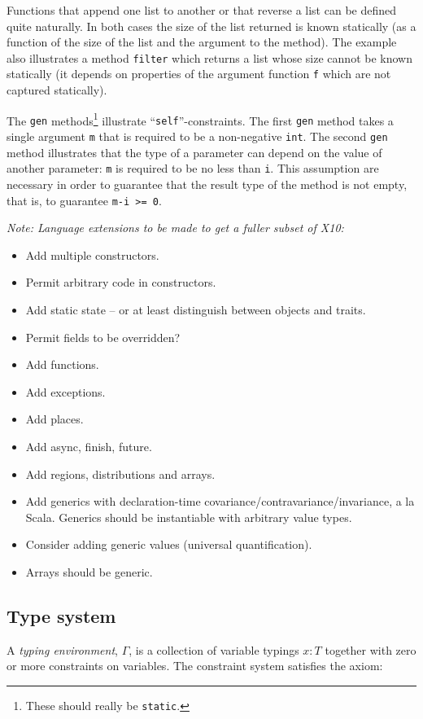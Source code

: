 \documentclass{article}
\def\Xten{{\sf X10}}
\begin{document}
\begin{example}[List]
Functions that append one list to another or that reverse a list can
be defined quite naturally. In both cases the size of the
list returned is known statically (as a function of the size of the
list and the argument to the method).  The example also illustrates a
method {\tt filter} which returns a list whose size cannot be known
statically (it depends on properties of the argument function {\tt f}
which are not captured statically).

The {\tt gen} methods\footnote{These should really be {\tt static}.}
illustrate ``{\tt self}''-constraints. The first {\tt gen} method
takes a single argument {\tt m} that is required to be a non-negative
{\tt int}.  The second {\tt gen} method illustrates that the type of a
parameter can depend on the value of another parameter: {\tt m} is
required to be no less than {\tt i}. This assumption are necessary in
order to guarantee that the result type of the method is not empty,
that is, to guarantee {\tt m-i >= 0}.
\end{example}

{\em Note:
Language extensions to be made to get a fuller subset of \Xten:

\begin{itemize}
  \item Add multiple constructors.
  \item Permit arbitrary code in constructors.
  \item Add static state -- or at least distinguish between objects and traits.
  \item Permit fields to be overridden?
  \item Add functions.
  \item Add exceptions.
  \item Add places.
  \item Add async, finish, future.
  \item Add regions, distributions and arrays.
  \item Add generics with declaration-time
  covariance/contravariance/invariance, a la Scala.  Generics should
  be instantiable with arbitrary value types.
  \item Consider adding generic values (universal quantification).
  \item Arrays should be generic.
\end{itemize}
}

\subsection{Type system}
A {\em typing environment}, $\Gamma$, is a collection of variable
typings $x:T$ together with zero or more constraints on variables. The
constraint system satisfies the axiom:
\end{document}
